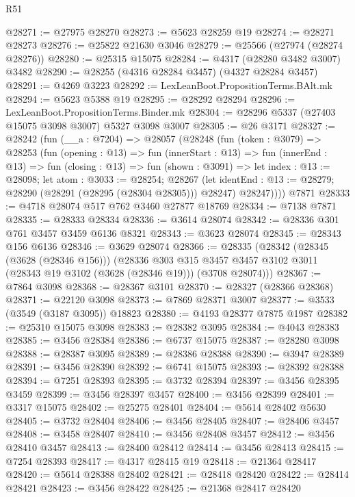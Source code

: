 \begin{lexlean}{R51}
\begin{coremodule}
@28271 := @27975 @28270
@28273 := @5623 @28259 @19
@28274 := @28271 @28273
@28276 := @25822 @21630 @3046
@28279 := @25566 (@27974 (@28274 @28276))
@28280 := @25315 @15075
@28284 := @4317 (@28280 @3482 @3007) @3482
@28290 := @28255 (@4316 @28284 @3457) (@4327 @28284 @3457)
@28291 := @4269 @3223
@28292 := LexLeanBoot.PropositionTerms.BAlt.mk
@28294 := @5623 @5388 @19
@28295 := @28292 @28294
@28296 := LexLeanBoot.PropositionTerms.Binder.mk
@28304 := @28296 @5337 (@27403 @15075 @3098 @3007) @5327 @3098 @3007
@28305 := @26 @3171
@28327 := @28242
    (fun (__a : @7204) =>
    @28057
      (@28248
        (fun (token : @3079) =>
        @28253
          (fun (opening : @13) =>
          fun (innerStart : @13) =>
          fun (innerEnd : @13) =>
          fun (closing : @13) =>
          fun (shown : @3091) =>
          let index : @13 := @28098;
          let atom : @3033 := @28254;
          @28267
            (let identEnd : @13 := @28279; @28290 (@28291 (@28295 (@28304 @28305))) @28247)
            @28247))))
    @7871
@28333 := @4718 @28074 @517 @762 @3460 @27877 @18769
@28334 := @7138 @7871
@28335 := @28333 @28334
@28336 := @3614 @28074
@28342 := @28336 @301 @761 @3457 @3459 @6136 @8321
@28343 := @3623 @28074
@28345 := @28343 @156 @6136
@28346 := @3629 @28074
@28366 := @28335
    (@28342
      (@28345 (@3628 (@28346 @156)))
      (@28336
        @303
        @315
        @3457
        @3457
        @3102
        @3011
        (@28343 @19 @3102 (@3628 (@28346 @19)))
        (@3708 @28074)))
@28367 := @7864 @3098
@28368 := @28367 @3101
@28370 := @28327 (@28366 @28368)
@28371 := @22120 @3098
@28373 := @7869 @28371 @3007
@28377 := @3533 (@3549 (@3187 @3095)) @18823
@28380 := @4193 @28377 @7875 @1987
@28382 := @25310 @15075 @3098
@28383 := @28382 @3095
@28384 := @4043 @28383
@28385 := @3456 @28384
@28386 := @6737 @15075
@28387 := @28280 @3098
@28388 := @28387 @3095
@28389 := @28386 @28388
@28390 := @3947 @28389
@28391 := @3456 @28390
@28392 := @6741 @15075
@28393 := @28392 @28388
@28394 := @7251 @28393
@28395 := @3732 @28394
@28397 := @3456 @28395 @3459
@28399 := @3456 @28397 @3457
@28400 := @3456 @28399
@28401 := @3317 @15075
@28402 := @25275 @28401
@28404 := @5614 @28402 @5630
@28405 := @3732 @28404
@28406 := @3456 @28405
@28407 := @28406 @3457
@28408 := @3458 @28407
@28410 := @3456 @28408 @3457
@28412 := @3456 @28410 @3457
@28413 := @28400 @28412
@28414 := @3456 @28413
@28415 := @7254 @28393
@28417 := @4317 @28415 @19
@28418 := @21364 @28417
@28420 := @5614 @28388 @28402
@28421 := @28418 @28420
@28422 := @28414 @28421
@28423 := @3456 @28422
@28425 := @21368 @28417 @28420

\end{coremodule}
\end{lexlean}
